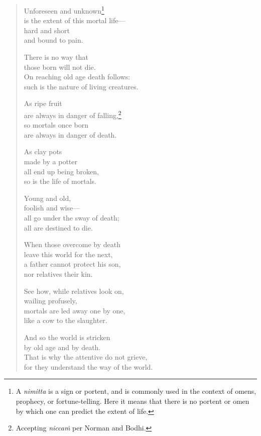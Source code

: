 \documentclass[12pt,openany]{book}%
\begin{document}
\begin{verse}%
Unforeseen and unknown\footnote{A \textit{nimitta} is a sign or portent, and is commonly used in the context of omens, prophecy, or fortune-telling. Here it means that there is no portent or omen by which one can predict the extent of life. } \\
is the extent of this mortal life—\\
hard and short \\
and bound to pain. 

There is no way that \\
those born will not die. \\
On reaching old age death follows: \\
such is the nature of living creatures. 

As ripe fruit \\
are always in danger of falling,\footnote{Accepting \textit{\textsanskrit{niccaṁ}} per Norman and Bodhi. } \\
so mortals once born \\
are always in danger of death. 

As clay pots \\
made by a potter \\
all end up being broken, \\
so is the life of mortals. 

Young and old, \\
foolish and wise—\\
all go under the sway of death; \\
all are destined to die. 

When those overcome by death \\
leave this world for the next, \\
a father cannot protect his son, \\
nor relatives their kin. 

See how, while relatives look on, \\
wailing profusely, \\
mortals are led away one by one, \\
like a cow to the slaughter. 

And so the world is stricken \\
by old age and by death. \\
That is why the attentive do not grieve, \\
for they understand the way of the world. 


\end{verse}
\end{document}

